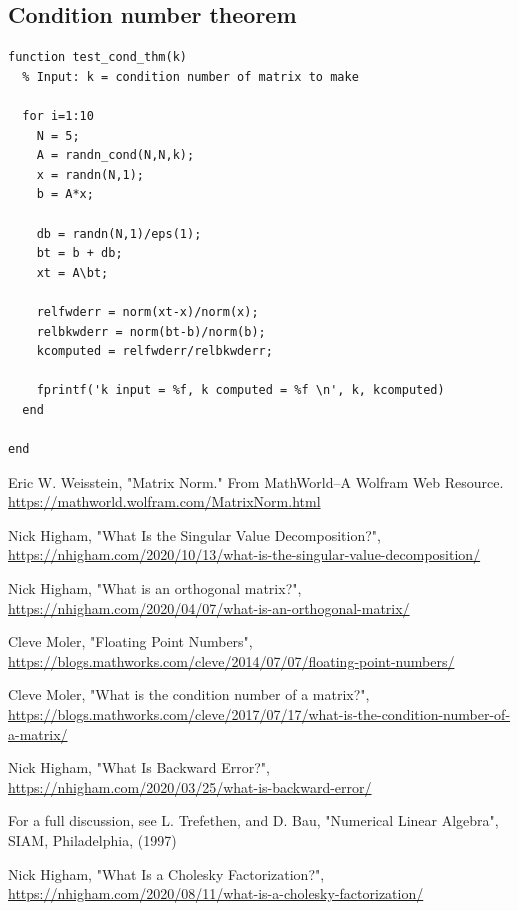 \documentclass[onefignum,onetabnum]{siamart190516}
\begin{document}
\subsection{Condition number theorem}
\label{Mat:CondThm}

\begin{verbatim}
function test_cond_thm(k)
  % Input: k = condition number of matrix to make

  for i=1:10
    N = 5;
    A = randn_cond(N,N,k);
    x = randn(N,1);
    b = A*x;

    db = randn(N,1)/eps(1);
    bt = b + db;
    xt = A\bt;

    relfwderr = norm(xt-x)/norm(x);
    relbkwderr = norm(bt-b)/norm(b);
    kcomputed = relfwderr/relbkwderr;

    fprintf('k input = %f, k computed = %f \n', k, kcomputed)
  end

end
\end{verbatim}


%
%

\begin{thebibliography}{9}
	
 Eric W. Weisstein, "Matrix Norm." From MathWorld--A Wolfram Web Resource.  \url{https://mathworld.wolfram.com/MatrixNorm.html}

 Nick Higham, "What Is the Singular Value Decomposition?", \url{https://nhigham.com/2020/10/13/what-is-the-singular-value-decomposition/}
	
 Nick Higham, "What is an orthogonal matrix?", \url{https://nhigham.com/2020/04/07/what-is-an-orthogonal-matrix/}

 Cleve Moler, "Floating Point Numbers", \url{https://blogs.mathworks.com/cleve/2014/07/07/floating-point-numbers/}

 Cleve Moler, "What is the condition number of a matrix?", \url{https://blogs.mathworks.com/cleve/2017/07/17/what-is-the-condition-number-of-a-matrix/}

 Nick Higham, "What Is Backward Error?", \url{https://nhigham.com/2020/03/25/what-is-backward-error/}

 For a full discussion, see L. Trefethen, and D. Bau,
"Numerical Linear Algebra", 
SIAM, Philadelphia, (1997)

 Nick Higham,  "What Is a Cholesky Factorization?",  \url{https://nhigham.com/2020/08/11/what-is-a-cholesky-factorization/}

\end{thebibliography}

% 

\end{document}

